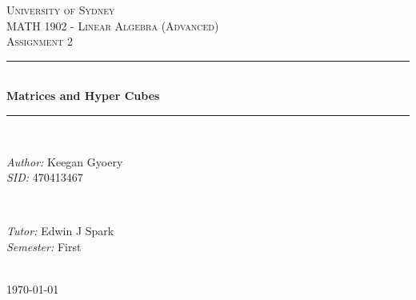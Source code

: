 \documentclass[a4paper]{article}
\begin{document}
\begin{titlepage}

\newcommand{\HRule}{\rule{\linewidth}{0.5mm}} %

\center %
 
\textsc{\LARGE University of Sydney}\\[1.5cm] %
\textsc{\Large MATH 1902 - Linear Algebra (Advanced)}\\[0.5cm] %
\textsc{\large Assignment 2}\\[0.5cm] %

\HRule \\[0.4cm]
{ \huge \bfseries Matrices and Hyper Cubes}\\[0.4cm] %
\HRule \\[1.5cm]

\begin{minipage}{0.4\textwidth}
\begin{flushleft} \large
\emph{Author:}
Keegan Gyoery %
\\
\emph{SID:}
470413467
\end{flushleft}
\end{minipage}
~
\begin{minipage}{0.4\textwidth}
\begin{flushright} \large
\emph{Tutor:} 
Edwin J Spark %
\\
\emph{Semester:}
First
\end{flushright}
\end{minipage}\\[4cm]

{\large \today}\\[3cm] %

\vfill %

\end{titlepage}

\end{document}
